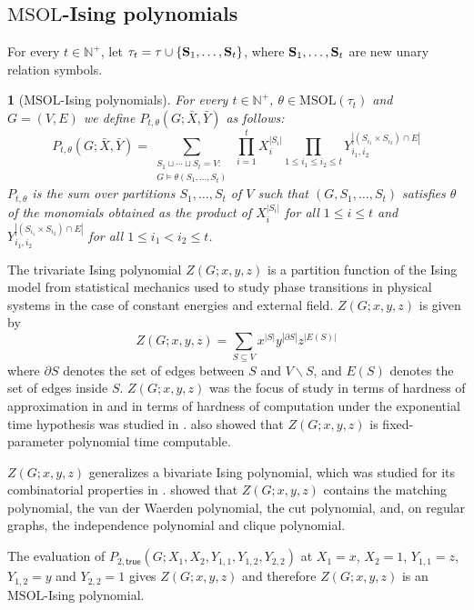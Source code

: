 \documentclass{llncs}
\newtheorem{defn}[thm]{\protect\definitionname}
\newcommand{\MSOL}{\mathrm{MSOL}}
\newcommand{\N}{\mathbb{N}}
\providecommand{\definitionname}{Definition}
\begin{document}
\subsection{$\MSOL$-Ising polynomials \label{se:MSOLISing}}

For every $t\in\mathbb{N}^{+}$, let $\tau_{t}=\tau\cup\{\mathbf{S}_{1},\ldots,{\bf S}_{t}\}$,
where ${\bf S}_{1},\ldots,{\bf S}_{t}$ are new unary relation symbols.
\begin{defn}
[$\MSOL$-Ising polynomials] \label{def:MSOLIsing} For every $t\in\N^{+}$,
$\theta\in\MSOL(\tau_{t})$ and $G=(V,E)$ we define $P_{t,\theta}(G;\bar{X},\bar{Y})$
as follows: 
\[
P_{t,\theta}(G;\bar{X},\bar{Y})=\sum_{\substack{S_{1}\sqcup\cdots\sqcup S_{t}=V:\\
G\models\theta(S_{1},\ldots,S_{t})
}
}\,\prod_{i=1}^{t}X_{i}^{|S_{i}|}\prod_{1\leq i_{1}\leq i_{2}\leq t}Y_{i_{1},i_{2}}^{|(S_{i_{1}}\times S_{i_{2}})\cap E|}
\]
$P_{t,\theta}$ is the sum over partitions $S_{1},\ldots,S_{t}$ of
$V$ such that $\left(G,S_{1},\ldots,S_{t}\right)$ satisfies $\theta$
of the monomials obtained as the product of $X_{i}^{|S_{i}|}$ for
all $1\leq i\leq t$ and $Y_{i_{1},i_{2}}^{|(S_{i_{1}}\times S_{i_{2}})\cap E|}$
for all $1\leq i_{1}<i_{2}\leq t$. \end{defn}

 
\begin{example}
 The trivariate Ising polynomial $Z(G;x,y,z)$
is a partition function of the Ising model from statistical mechanics
used to study phase transitions in physical systems in the case of
constant energies and external field. $Z(G;x,y,z)$ is given by 
\[
Z(G;x,y,z)=\sum_{S\subseteq V}x^{|S|}y^{|\partial S|}z^{|E(S)|}
\]
where $\partial S$ denotes the set of edges between $S$ and $V\backslash S$,
and $E(S)$ denotes the set of edges inside $S$. $Z(G;x,y,z)$ was
the focus of study in terms of hardness of approximation in \cite{ar:GJP03}
and in terms of hardness of computation under the exponential time
hypothesis was studied in \cite{kotek2012complexity}. \cite{kotek2012complexity}
also showed that $Z(G;x,y,z)$ is fixed-parameter polynomial time
computable.

$\ensuremath{Z(G;x,y,z)}$ generalizes a bivariate Ising polynomial,
which was studied for its combinatorial properties in \cite{ar:AndrenMarkstrom2009}.
\cite{ar:AndrenMarkstrom2009} showed that $Z(G;x,y,z)$ contains
the matching polynomial, the van der Waerden polynomial, the cut polynomial,
and, on regular graphs, the independence polynomial and clique polynomial. 

The evaluation of $P_{2,\mathsf{true}}(G;X_{1},X_{2},Y_{1,1},Y_{1,2},Y_{2,2})$ 
at 
$X_1=x$, $X_2=1$, $Y_{1,1}=z$, $Y_{1,2}=y$ and $Y_{2,2}=1$
gives $Z(G;x,y,z)$ and therefore $Z(G;x,y,z)$ is an $\MSOL$-Ising polynomial.
\end{example}
\end{document}

